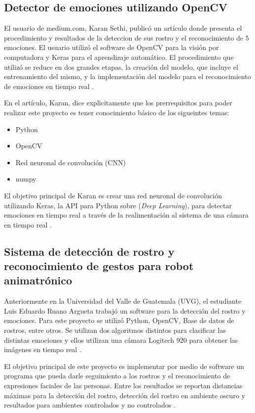 \subsection*{Detector de emociones utilizando OpenCV}
El usuario de medium.com, Karan  Sethi, publicó un artículo donde presenta el procedimiento y resultados de la deteccion de sus rostro y el reconocimiento de 5 emociones. El usuario utilizó el software de OpenCV para la visión por computadora y Keras para el aprendizaje automático. El procedimiento que utilizó se reduce en dos grandes etapas, la creación del modelo, que incluye el entrenamiento del mismo, y la implementación del modelo para el reconocimiento de emociones en tiempo real \cite{Karan}.

En el artículo, Karan, dice explicitamente que los prerrequisitos para poder realizar este proyecto es tener conocimiento básico de los sigueintes temas:
\begin{itemize}
\item Python
\item OpenCV
\item Red neuronal de convolución (CNN)
\item numpy
\end{itemize}

El objetivo principal de Karan es crear una red neuronal de convolución utilizando Keras, la API para Python sobre (\textit{Deep Learning}), para detectar emociones en tiempo real a través de la realimentación al sistema de una cámara en tiempo real \cite{Karan}.

\subsection*{Sistema de detección de rostro y reconocimiento de gestos para robot animatrónico}
Anteriormente en la Universidad del Valle de Guatemala (UVG), el estudiante Luis Eduardo Ruano Argueta trabajó un software para la detección del rostro y emociones. Para este proyecto se utilizó Python, OpenCV, Base de datos de rostros, entre otros. Se utilizan dos algoritmos distintos para clasificar las distintas emociones y ellos utilizan una cámara Logitech 920 para obtener las imágenes en tiempo real \cite{Ruano2019Tesis}.

El objetivo principal de este proyecto es implementar por medio de software un programa que pueda darle seguimiento a los rostros y el reconocimiento de expresiones faciales de las personas. Entre los resultados se reportan distancias máximas para la detección del rostro, detección del rostro en ambiente oscuro y resultados para ambientes controlados y no controlados \cite{Ruano2019Tesis}.